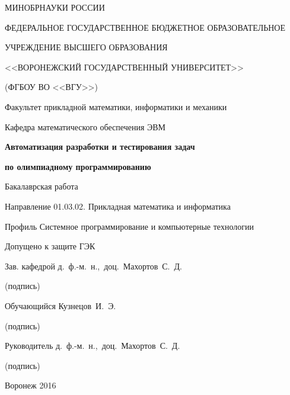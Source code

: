 \thispagestyle{empty}

\begin{center}
{\small
МИНОБРНАУКИ РОССИИ\par
ФЕДЕРАЛЬНОЕ ГОСУДАРСТВЕННОЕ БЮДЖЕТНОЕ ОБРАЗОВАТЕЛЬНОЕ\par
УЧРЕЖДЕНИЕ ВЫСШЕГО ОБРАЗОВАНИЯ\par
<<ВОРОНЕЖСКИЙ ГОСУДАРСТВЕННЫЙ УНИВЕРСИТЕТ>>\par
(ФГБОУ ВО <<ВГУ>>)\par
\vspace{4mm}}

Факультет прикладной математики, информатики и механики\par
\vspace{5mm}
Кафедра математического обеспечения ЭВМ\par
\vspace{35mm}

\textbf{Автоматизация разработки и тестирования задач}\par
\textbf{по олимпиадному программированию}\par
\vspace{8mm}

Бакалаврская работа\par
Направление 01.03.02. Прикладная математика и информатика\par
Профиль Системное программирование и компьютерные технологии\par
\end{center}
\vspace{35mm}

Допущено к защите ГЭК \underline{\qquad\qquad\qquad}\par
\vspace{8mm}
Зав. кафедрой \underline{\qquad\qquad\qquad} \qquad\qquad\qquad д.~ф.-м.~н.,~доц.~Махортов~С.~Д.\par
\qquad\qquad\qquad\qquad(подпись)\par
\vspace{2mm}
Обучающийся \underline{\qquad\qquad\qquad} \qquad\qquad\qquad Кузнецов~И.~Э.\par
\qquad\qquad\qquad\qquad(подпись)\par
\vspace{2mm}
Руководитель \underline{\qquad\qquad\qquad} \qquad\qquad\qquad д.~ф.-м.~н.,~доц.~Махортов~С.~Д.\par
\qquad\qquad\qquad\qquad(подпись)\par
\vspace{11mm}

\begin{center}
Воронеж 2016
\end{center}